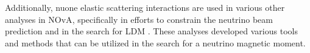 



Additionally, \gls{nuone} elastic scattering interactions are used in various other analyses in \gls{NOvA}, specifically in efforts to constrain the neutrino beam prediction \cite{NOVA-doc-56383, Nuone_Neutrino2022Poster} and in the search for \gls{LDM} \cite{NOVA-doc-59439}. These analyses developed various tools and methods that can be utilized in the search for a neutrino magnetic moment.


